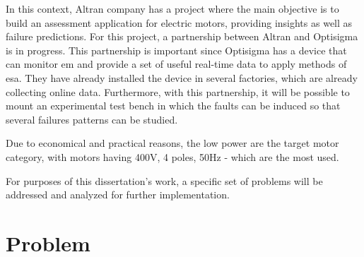 In this context, Altran company has a project where the main objective is to build an assessment application for electric motors, providing insights as well as failure predictions. For this project, a partnership between Altran and Optisigma is in progress. This partnership is important since Optisigma has a device that can monitor \acrlong{em} and provide a set of useful real-time data to apply methods of \acrfull{esa}. They have already installed the device in several factories, which are already collecting online data. Furthermore, with this partnership, it will be possible to mount an experimental test bench in which the faults can be induced so that several failures patterns can be studied. 

Due to economical and practical reasons, the low power  are the target motor category, with motors having 400V, 4 poles, 50Hz - which are the most used.

For purposes of this dissertation's work, a specific set of problems will be addressed and analyzed for further implementation.





\section{Problem} %
\label{sec:problem}


